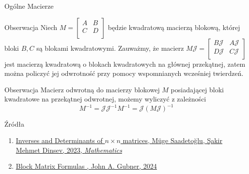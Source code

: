 \documentclass{beamer}
\begin{document}
\begin{frame}{Ogólne Macierze}
    \begin{block}{Obserwacja}
        Niech $M = \begin{bmatrix}
            A & B \\ C & D \\
        \end{bmatrix}$ będzie kwadratową macierzą blokową, której bloki $B, C$ są blokami kwadratowymi. 
        Zauważmy, że macierz $M\mathcal{J} = \begin{bmatrix}
            B\mathcal{J} & A\mathcal{J} \\ D\mathcal{J} & C\mathcal{J} \\
        \end{bmatrix}$ jest macierzą kwadratową o blokach kwadratowych na głównej przekątnej, zatem można policzyć jej odwrotność 
        przy pomocy wspomnianych wcześniej twierdzeń. 
    \end{block}
    \begin{block}{Obserwacja}
        Macierz odwrotną do macierzy blokowej $M$ posiadającej bloki kwadratowe na przekątnej odwrotnej, możemy wyliczyć z zależności
        $$M^{-1} = \mathcal{J}\mathcal{J}^{-1} M^{-1} = \mathcal{J} (M\mathcal{J})^{-1}$$
    \end{block}
\end{frame}
\begin{frame}{Źródła}
    \begin{enumerate}
        \item \href{https://www.mdpi.com/2227-7390/11/17/3784}{Inverses and Determinants of $n \times n$ matrices, Müge Saadetoğlu, Şakir Mehmet Dinsev, 2023, \textit{Mathematics}}
        \item \href{https://gubner.ece.wisc.edu/notes/BlockMatrixFormulas.pdf}{Block Matrix Formulas , John A. Gubner, 2024}
    \end{enumerate}
\end{frame}
\end{document}
